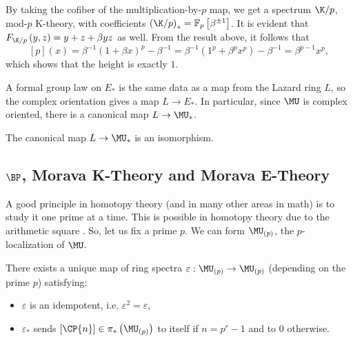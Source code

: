 
\begin{example}\label{k-thy-modp-height}
	By taking the cofiber of the multiplication-by-$p$ map, we get a spectrum $\K/p$, mod-$p$ K-theory, with coefficients $\left(\K/p\right)_* = \mathbb{F}_p \left[\beta^{\pm 1}\right]$.
	It is evident that $F_{\K/p}\left(y,z\right) = y + z + \beta y z$ as well.
	From the result above, it follows that
	$$
	\left[p\right]\left(x\right)
	= \beta^{-1} \left(1 + \beta x\right)^p - \beta^{-1}
	= \beta^{-1} \left(1^p + \beta^p x^p\right) - \beta^{-1}
	= \beta^{p-1} x^p,
	$$
	which shows that the height is exactly $1$.
\end{example}

A formal group law on $E_*$ is the same data as a map from the Lazard ring $L$, so the complex orientation gives a map $L \to E_*$.
In particular, since $\MU$ is complex oriented, there is a canonical map $L \to \MU_*$.

\begin{theorem}\label{quillen-theorem}
	The canonical map $L \to \MU_*$ is an isomorphism.
\end{theorem}



\subsection{\texorpdfstring{$\BP$}{BP}, Morava K-Theory and Morava E-Theory}

A good principle in homotopy theory (and in many other areas in math) is to study it one prime at a time.
This is possible in homotopy theory due to the arithmetic square .
So, let us fix a prime $p$.
We can form $\MU_{\left(p\right)}$, the $p$-localization of $\MU$.

\begin{theorem}
	There exists a unique map of ring spectra $\varepsilon: \MU_{\left(p\right)} \to \MU_{\left(p\right)}$ (depending on the prime $p$) satisfying:
	\begin{itemize}
		\item $\varepsilon$ is an idempotent, i.e. $\varepsilon^2 = \varepsilon$,
		\item $\varepsilon_*$ sends $\left[\CP{n}\right] \in \pi_*\left(\MU_{\left(p\right)}\right)$ to itself if $n = p^r-1$ and to $0$ otherwise.
	\end{itemize}
\end{theorem}

